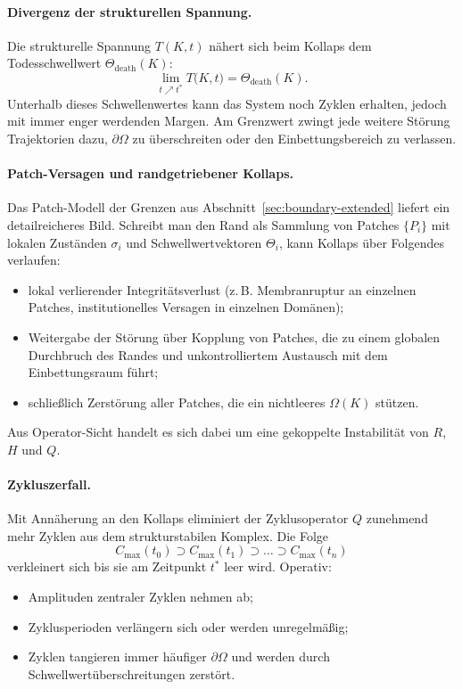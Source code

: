 \paragraph{Divergenz der strukturellen Spannung.}
Die strukturelle Spannung \(T(K,t)\) nähert sich beim Kollaps dem Todesschwellwert
\(\Theta_{\mathrm{death}}(K)\):
\[
  \lim_{t\nearrow t^{\ast}} T\big(K,t\big)
    = \Theta_{\mathrm{death}}(K).
\]
Unterhalb dieses Schwellenwertes kann das System noch Zyklen erhalten, jedoch mit
immer enger werdenden Margen. Am Grenzwert zwingt jede weitere Störung
Trajektorien dazu, \(\partial\Omega\) zu überschreiten oder den
Einbettungsbereich zu verlassen.

\paragraph{Patch-Versagen und randgetriebener Kollaps.}
Das Patch-Modell der Grenzen aus
Abschnitt~\ref{sec:boundary-extended} liefert ein detailreicheres Bild.
Schreibt man den Rand als Sammlung von Patches \(\{P_i\}\) mit lokalen Zuständen
\(\sigma_i\) und Schwellwertvektoren \(\Theta_i\), kann Kollaps über
Folgendes verlaufen:
\begin{itemize}
  \item lokal verlierender Integritätsverlust (z.\,B. Membranruptur an einzelnen
        Patches, institutionelles Versagen in einzelnen Domänen);
  \item Weitergabe der Störung über Kopplung von Patches, die zu einem globalen
        Durchbruch des Randes und unkontrolliertem Austausch mit dem
        Einbettungsraum führt;
  \item schließlich Zerstörung aller Patches, die ein nichtleeres
        \(\Omega(K)\) stützen.
\end{itemize}
Aus Operator-Sicht handelt es sich dabei um eine gekoppelte Instabilität von
\(R\), \(H\) und \(Q\).

\paragraph{Zykluszerfall.}
Mit Annäherung an den Kollaps eliminiert der Zyklusoperator \(Q\) zunehmend
mehr Zyklen aus dem strukturstabilen Komplex. Die Folge
\[
  C_{\max}(t_0)
  \supset C_{\max}(t_1)
  \supset \dots
  \supset C_{\max}(t_n)
\]
verkleinert sich bis sie am Zeitpunkt \(t^{\ast}\) leer wird. Operativ:
\begin{itemize}
  \item Amplituden zentraler Zyklen nehmen ab;
  \item Zyklusperioden verlängern sich oder werden unregelmäßig;
  \item Zyklen tangieren immer häufiger \(\partial\Omega\) und werden durch
        Schwellwertüberschreitungen zerstört.
\end{itemize}


